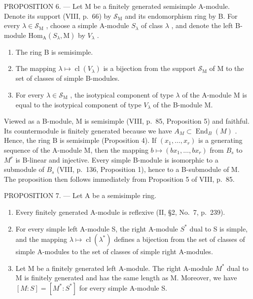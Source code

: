 PROPOSITION 6. --- Let M be a finitely generated semisimple A-module. Denote its support (VIII, p.~66) by \(\mathcal{S}_{\mathrm{M}}\) and its endomorphism ring by B. For every \(\lambda \in \mathcal{S}_{\mathrm{M}}\) , choose a simple A-module \(S_{\lambda}\) of class \(\lambda\) , and denote the left B-module \(\mathrm{Hom}_{\mathrm{A}}(S_{\lambda}, \mathrm{M})\) by \(V_{\lambda}\) .

\begin{enumerate}
\def\labelenumi{\alph{enumi})}
\item
  The ring B is semisimple.
\item
  The mapping \(\lambda \mapsto \operatorname{cl}(V_{\lambda})\) is a bijection from the support \(\mathcal{S}_{\mathrm{M}}\) of M to the set of classes of simple B-modules.
\item
  For every \(\lambda \in \mathcal{S}_{\mathrm{M}}\) , the isotypical component of type \(\lambda\) of the A-module M is equal to the isotypical component of type \(V_{\lambda}\) of the B-module M.
\end{enumerate}

Viewed as a B-module, M is semisimple (VIII, p.~85, Proposition 5) and faithful. Its countermodule is finitely generated because we have \(A_{M} \subset \operatorname{End}_{B}(M)\) . Hence, the ring B is semisimple (Proposition 4). If \((x_{1}, \ldots, x_{r})\) is a generating sequence of the A-module M, then the mapping \(b \mapsto (bx_{1}, \ldots, bx_{r})\) from \(B_{s}\) to \(M^{r}\) is B-linear and injective. Every simple B-module is isomorphic to a submodule of \(B_{s}\) (VIII, p.~136, Proposition 1), hence to a B-submodule of M. The proposition then follows immediately from Proposition 5 of VIII, p.~85.

PROPOSITION 7. --- Let A be a semisimple ring.

\begin{enumerate}
\def\labelenumi{\alph{enumi})}
\item
  Every finitely generated A-module is reflexive (II, §2, No.~7, p.~239).
\item
  For every simple left A-module S, the right A-module \(S^{*}\) dual to S is simple, and the mapping \(\lambda \mapsto \operatorname{cl}(\lambda^{*})\) defines a bijection from the set of classes of simple A-modules to the set of classes of simple right A-modules.
\item
  Let M be a finitely generated left A-module. The right A-module \(M^{*}\) dual to M is finitely generated and has the same length as M. Moreover, we have \([M:S]=[M^{*}:S^{*}]\) for every simple A-module S.
\end{enumerate}

